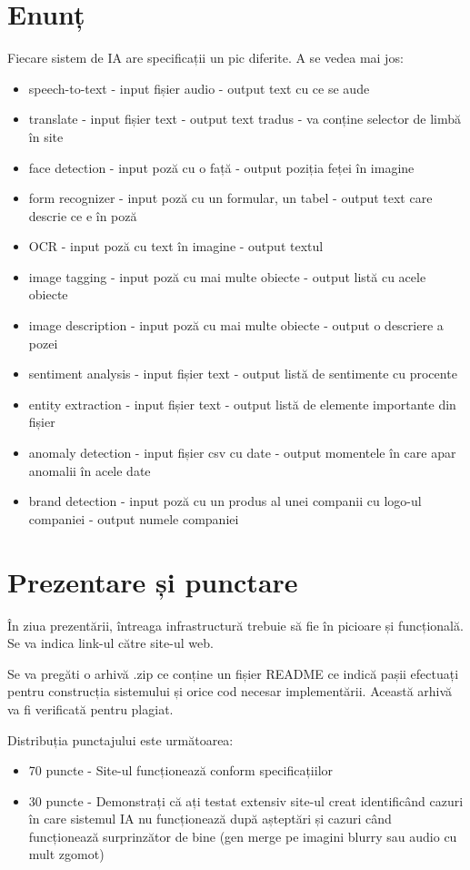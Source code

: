 \documentclass{article}
\newcounter{ProblemCounter} %
\newcommand{\ProblemName}{}
\newenvironment{Problem}[1][Sectiunea \arabic{ProblemCounter}]{ %
\stepcounter{ProblemCounter} %
\renewcommand{\ProblemName}{#1} %
\section{\ProblemName} %
}{}
\begin{document}
\begin{Problem}[Enunț]
Fiecare sistem de IA are specificații un pic diferite. A se vedea mai jos:
\begin{itemize}
    \item speech-to-text - input fișier audio - output text cu ce se aude
    \item translate - input fișier text - output text tradus - va conține selector de limbă în site
    \item face detection - input poză cu o față - output poziția feței în imagine
    \item form recognizer - input poză cu un formular, un tabel - output text care descrie ce e în poză
    \item OCR - input poză cu text în imagine - output textul
    \item image tagging - input poză cu mai multe obiecte - output listă cu acele obiecte
    \item image description - input poză cu mai multe obiecte - output o descriere a pozei
    \item sentiment analysis - input fișier text - output listă de sentimente cu procente
    \item entity extraction - input fișier text - output listă de elemente importante din fișier
    \item anomaly detection - input fișier csv cu date - output momentele în care apar anomalii în acele date
    \item brand detection - input poză cu un produs al unei companii cu logo-ul companiei - output numele companiei
\end{itemize}

\end{Problem}

\begin{Problem}[Prezentare și punctare]

În ziua prezentării, întreaga infrastructură trebuie să fie în picioare și funcțională. Se va indica link-ul către site-ul web.

Se va pregăti o arhivă .zip ce conține un fișier README ce indică pașii efectuați pentru construcția sistemului și orice cod necesar implementării. Această arhivă va fi verificată pentru plagiat.

    Distribuția punctajului este următoarea:
\begin{itemize}
    \item 70 puncte - Site-ul funcționează conform specificațiilor
    \item 30 puncte - Demonstrați că ați testat extensiv site-ul creat identificând cazuri în care sistemul IA nu funcționează după așteptări și cazuri când funcționează surprinzător de bine (gen merge pe imagini blurry sau audio cu mult zgomot)

\end{itemize}

\end{Problem}
\end{document}
